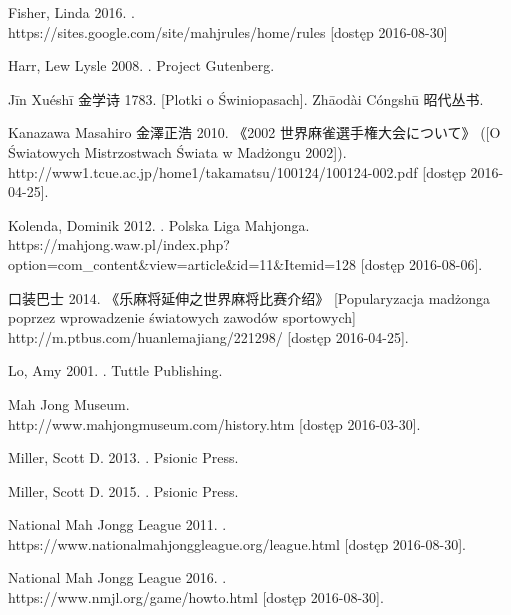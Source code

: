 Fisher, Linda 2016. .
\\https://sites.google.com/site/mahjrules/home/rules [dostęp 2016-08-30]

Harr, Lew Lysle 2008. . Project
Gutenberg.

Jīn Xuéshī 金学诗 1783.  [Plotki o Świniopasach].
Zhāodài Cóngshū 昭代丛书.

Kanazawa Masahiro 金澤正浩 2010.  《2002 世界麻雀選手権大会について》 ([O Światowych Mistrzostwach
Świata w Madżongu 2002]).
\\http://www1.tcue.ac.jp/home1/takamatsu/100124/100124-002.pdf [dostęp
2016-04-25].

Kolenda, Dominik 2012. . Polska Liga Mahjonga.
\\https://mahjong.waw.pl/index.php?option=com\_content\&view=article\&id=11\&Itemid=128
[dostęp 2016-08-06].

 口装巴士 2014.  《乐麻将延伸之世界麻将比赛介绍》
[Popularyzacja madżonga poprzez wprowadzenie światowych zawodów
sportowych] \\http://m.ptbus.com/huanlemajiang/221298/ [dostęp 2016-04-25].

Lo, Amy 2001. . Tuttle
Publishing.

Mah Jong Museum. 
\\http://www.mahjongmuseum.com/history.htm [dostęp
2016-03-30].


Miller, Scott D. 2013. . Psionic Press.

Miller, Scott D. 2015. . Psionic Press.

National Mah Jongg League 2011. .
\\https://www.nationalmahjonggleague.org/league.html [dostęp 2016-08-30].

National Mah Jongg League 2016. .
\\https://www.nmjl.org/game/howto.html [dostęp 2016-08-30].

